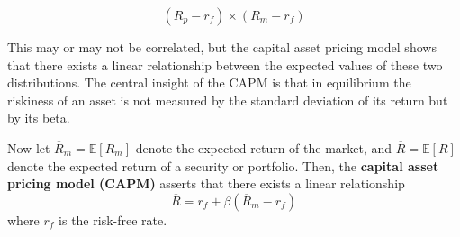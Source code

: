 \documentclass{article}
\begin{document}
    \begin{equation}
      (R_p - r_f) \times (R_m - r_f)
    \end{equation}

    This may or may not be correlated, but the capital asset pricing model shows that there exists a linear relationship between the expected values of these two distributions. The central insight of the CAPM is that in equilibrium the riskiness of an asset is not measured by the standard deviation of its return but by its beta. 

    \begin{theorem}[CAPM]
      Now let $\overline{R}_m = \mathbb{E}[R_m]$ denote the expected return of the market, and $\overline{R} = \mathbb{E}[R]$ denote the expected return of a security or portfolio. Then, the \textbf{capital asset pricing model (CAPM)} asserts that there exists a linear relationship 
      \begin{equation}
        \overline{R} = r_f + \beta (\overline{R}_m - r_f)
      \end{equation}
      where $r_f$ is the risk-free rate. 
    \end{theorem}
\end{document}
